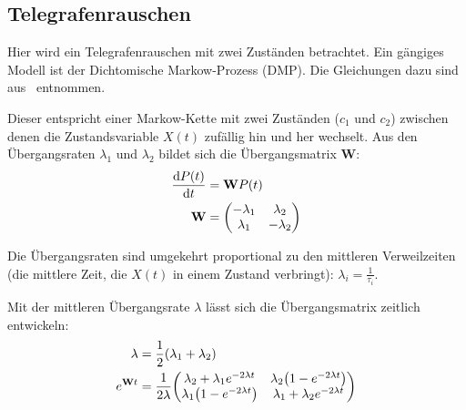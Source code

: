 \documentclass[main.tex]{subfiles}
\begin{document}
\subsection{Telegrafenrauschen}



Hier wird ein Telegrafenrauschen mit zwei Zuständen betrachtet.
Ein gängiges Modell ist der Dichtomische Markow-Prozess (DMP).
Die Gleichungen dazu sind aus~\cite{matphys} entnommen.

Dieser entspricht einer Markow-Kette mit zwei Zuständen (\(c_1\) und \(c_2\))
zwischen denen die Zustandsvariable \(X(t)\) zufällig hin und her wechselt. Aus
den Übergangsraten \(\lambda_1\) und \(\lambda_2\) bildet sich die
Übergangsmatrix \(\mathbf{W}\):
\begin{align}
	\dv{P(t)}{t} & = \mathbf{W} P(t) \\
	\mathbf{W}   & = \mqty(
	-\lambda_1   & \lambda_2         \\
	\lambda_1    & -\lambda_2)
\end{align}

Die Übergangsraten sind umgekehrt proportional zu den mittleren Verweilzeiten
(die mittlere Zeit, die \(X(t)\) in einem Zustand verbringt): \(\lambda_i =
\frac{1}{\tau_i}\).

Mit der mittleren Übergangsrate \(\lambda\) lässt sich die Übergangsmatrix
zeitlich entwickeln:
\begin{align}
	\lambda                            & = \frac{1}{2} \qty(\lambda_1 +
	\lambda_2)
	\\
	e^{\mathbf{W}t}                    & = \frac{1}{2\lambda}
	\mqty(\lambda_2 + \lambda_1
	e^{-2\lambda t}                    & \lambda_2 \qty(1- e^{-2\lambda t})
	\\
	\lambda_1 \qty(1- e^{-2\lambda t}) & \lambda_1 + \lambda_2 e^{-2\lambda
		t})
\end{align}
\end{document}
